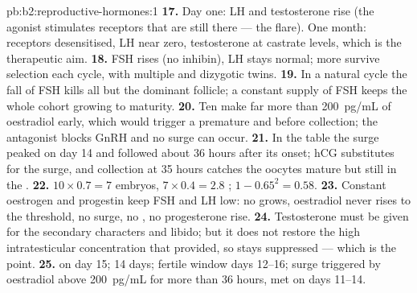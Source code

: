 \begin{solution}{pb:b2:reproductive-hormones:1}
\textbf{17.} Day one: LH and testosterone rise (the agonist
stimulates receptors that are still there --- the flare). One month:
receptors desensitised, LH near zero, testosterone at castrate
levels, which is the therapeutic aim.
\textbf{18.} FSH rises (no inhibin), LH stays normal; more 
survive selection each cycle, with multiple  and
dizygotic twins.
\textbf{19.} In a natural cycle the fall of FSH kills all but the
dominant follicle; a constant supply of FSH keeps the whole cohort
growing to maturity.
\textbf{20.} Ten  make far more than \qty{200}{pg/mL} of
oestradiol early, which would trigger a premature  and
 before collection; the antagonist blocks GnRH and no
surge can occur.
\textbf{21.} In the table the surge peaked on day 14 and 
followed about 36 hours after its onset; hCG substitutes for the
surge, and collection at 35 hours catches the oocytes mature but
still in the .
\textbf{22.} $10\times 0.7 = 7$ embryos, $7\times 0.4 = 2.8$
; $1 - 0.65^{2} = 0.58$.
\textbf{23.} Constant oestrogen and progestin keep FSH and LH low: no
 grows, oestradiol never rises to the threshold, no surge,
no , no progesterone rise.
\textbf{24.} Testosterone must be given for the secondary characters
and libido; but it does not restore the high intratesticular
concentration that  provided, so  stays
suppressed --- which is the point.
\textbf{25.}  on day 15;  14 days; fertile
window days 12--16; surge triggered by oestradiol above
\qty{200}{pg/mL} for more than 36 hours, met on days 11--14.
\end{solution}
